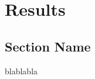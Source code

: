 \chapter{Results}
\label{chap:conc_results}

\section{Section Name}

\vspace{\baselineskip}
\noindent blablabla
\newline